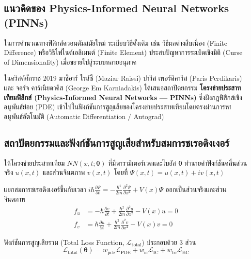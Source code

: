 \subsection{แนวคิดของ Physics-Informed Neural Networks (PINNs)}
ในการคำนวณทางฟิสิกส์ควอนตัมสมัยใหม่ ระเบียบวิธีดั้งเดิม เช่น วิธีผลต่างสืบเนื่อง (Finite Difference) หรือวิธีไฟไนต์เอลิเมนต์ (Finite Element) ประสบปัญหาการระเบิดเชิงมิติ (Curse of Dimensionality) เมื่อขยายไปสู่ระบบหลายอนุภาค 

ในคริสต์ศักราช 2019 มาซิอาร์ ไรส์ซี (Maziar Raissi) ปาริส เพอร์ดิคาริส (Paris Perdikaris) และ จอร์จ คาร์เนียดาคิส (George Em Karniadakis) ได้เสนอสถาปัตยกรรม \textbf{โครงข่ายประสาทเทียมฟิสิกส์ (Physics-Informed Neural Networks --- PINNs)} ซึ่งฝังกฎฟิสิกส์เชิงอนุพันธ์ย่อย (PDE) เข้าไปในฟังก์ชันการสูญเสียของโครงข่ายประสาทเทียมโดยตรงผ่านการหาอนุพันธ์อัตโนมัติ (Automatic Differentiation / Autograd)

\subsection{สถาปัตยกรรมและฟังก์ชันการสูญเสียสำหรับสมการชเรอดิงเงอร์}
ให้โครงข่ายประสาทเทียม $NN(x, t; \boldsymbol{\theta})$ ที่มีพารามิเตอร์เวตและไบอัส $\boldsymbol{\theta}$ ทำนายค่าฟังก์ชันคลื่นส่วนจริง $u(x, t)$ และส่วนจินตภาพ $v(x, t)$ โดยที่ $\Psi(x, t) = u(x, t) + i v(x, t)$

แยกสมการชเรอดิงเงอร์ขึ้นกับเวลา $i\hbar \frac{\partial \Psi}{\partial t} = -\frac{\hbar^2}{2m}\frac{\partial^2 \Psi}{\partial x^2} + V(x)\Psi$ ออกเป็นส่วนจริงและส่วนจินตภาพ
\begin{align}
f_u &= -\hbar \frac{\partial v}{\partial t} + \frac{\hbar^2}{2m}\frac{\partial^2 u}{\partial x^2} - V(x)u = 0 \\
f_v &= \hbar \frac{\partial u}{\partial t} + \frac{\hbar^2}{2m}\frac{\partial^2 v}{\partial x^2} - V(x)v = 0
\end{align}

ฟังก์ชันการสูญเสียรวม (Total Loss Function, $\mathcal{L}_{\text{total}}$) ประกอบด้วย 3 ส่วน
\begin{equation}
\mathcal{L}_{\text{total}}(\boldsymbol{\theta}) = w_{\text{pde}}\mathcal{L}_{\text{PDE}} + w_{\text{ic}}\mathcal{L}_{\text{IC}} + w_{\text{bc}}\mathcal{L}_{\text{BC}}
\label{eq:pinn_loss}
\end{equation}

